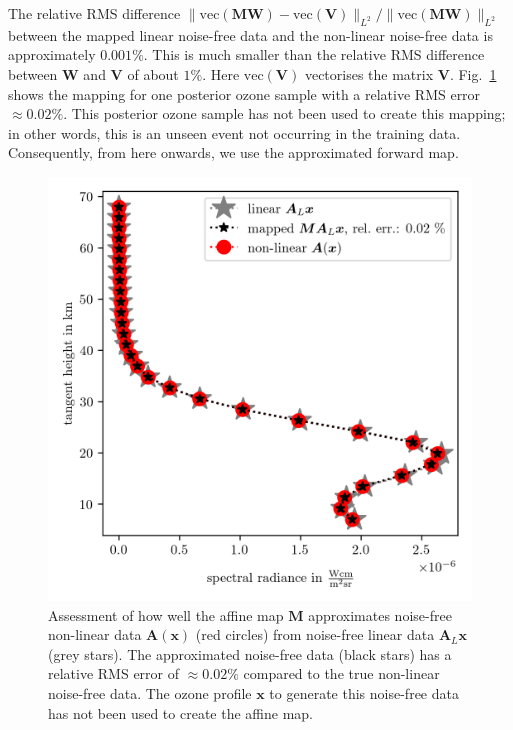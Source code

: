 The relative RMS difference $\lVert \text{vec}(\bm{M}\bm{W}) - \text{vec}(\bm{V})  \rVert_{L^2} / \lVert \text{vec}(\bm{M}\bm{W}) \rVert_{L^2} $ between the mapped linear noise-free data and the non-linear noise-free data is approximately $0.001\%$.
This is much smaller than the relative RMS difference between $\bm{W}$ and $\bm{V}$ of about $1\%$.
Here $\text{vec}(\bm{V})$ vectorises the matrix $\bm{V}$.
Fig.~\ref{fig:MapAsses} shows the mapping for one posterior ozone sample with a relative RMS error~$\approx0.02\%$.
This posterior ozone sample has not been used to create this mapping; in other words, this is an unseen event not occurring in the training data.
Consequently, from here onwards, we use the approximated forward map.
\begin{figure}[ht!]
	\centering
	\includegraphics{SampMapAssesmentTT.png}
	\caption[Assessment of affine map.]{Assessment of how well the affine map $\bm{M}$ approximates noise-free non-linear data $\bm{A}(\bm{x})$ (red circles) from noise-free linear data $\bm{A}_L\bm{x}$ (grey stars). The approximated noise-free data (black stars) has a relative RMS error of $\approx 0.02\%$ compared to the true non-linear noise-free data.
		The ozone profile $\bm{x}$ to generate this noise-free data has not been used to create the affine map.}
	\label{fig:MapAsses}
\end{figure}
\clearpage

